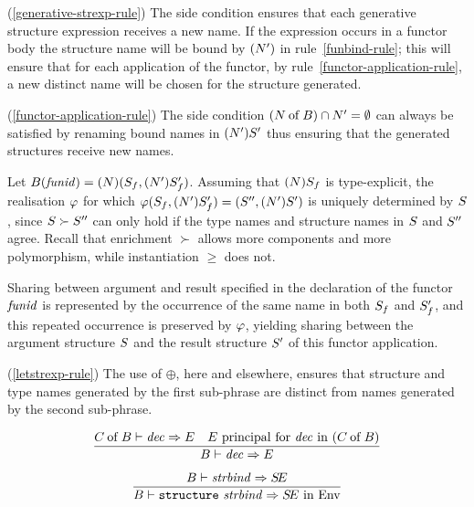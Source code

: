 \comments
\begin{description}
\item{(\ref{generative-strexp-rule})}
   The side condition ensures that each generative structure
expression receives a new name. If the expression occurs in
a functor body the structure name will be bound by $(\N')$ in
rule~\ref{funbind-rule}; this will ensure that for each application of the 
functor, by rule~\ref{functor-application-rule}, a new distinct name
will be chosen for the structure generated.
%
\item{(\ref{functor-application-rule})}
   The side condition $ (\of{\N}{\B})\cap\N'=\emptyset$  can always
be satisfied by renaming bound names in $(\N')S'$ thus ensuring that the
generated structures receive new names.

Let $\B(\funid)=(N)(\S_f,(N')\S_f')$. Assuming that $(\N)\S_f$ is
type-explicit, the realisation $\rea$ for which
$\rea(\S_f,(N')\S_f')=(\S'',(\N')\S')$ is uniquely determined by $\S$,
since $\S\succ\S''$ can only hold if the type names and structure
names in $\S$ and $\S''$ agree.  Recall that enrichment $\succ$ allows
more components and more polymorphism, while instantiation $\geq$ does
not.

Sharing between argument and result specified in the declaration of
the functor $\funid$ is represented by the occurrence of the same name
in both $\S_f$ and $\S_f'$, and this repeated occurrence is preserved
by $\rea$, yielding sharing between the argument structure $\S$ and
the result structure $\S'$ of this functor application.
%
\item{(\ref{letstrexp-rule})}
   The use of $\oplus$, here and elsewhere, ensures that structure
and type names generated by
the first sub-phrase
are distinct from names generated by the second
sub-phrase.
\end{description}

\begin{equation}                %
\label{dec-rule}
\frac{ \of{\C}{\B}\ts\dec\ra\E
       \quad\E\ {\rm principal\ for\ \dec\ in\ } (\of{\C}{\B})
}
     { \B\ts\dec\ra\E }\index{40.2}
\end{equation}

\vspace{6pt}
\begin{equation}        	%
\frac{ \B\ts\strbind\ra\SE }
     { \B\ts\singstrdec\ra\SE\ \In\ \Env }
\end{equation}


